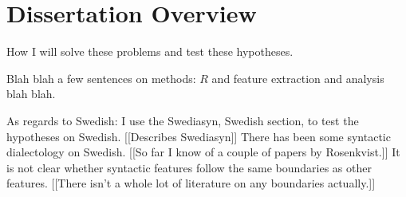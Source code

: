 \section{Dissertation Overview}

How I will solve these problems and test these hypotheses.

Blah blah a few sentences on methods: $R$ and feature extraction and
analysis blah blah.

As regards to Swedish: I use the Swediasyn, Swedish section, to test
the hypotheses on Swedish. [[Describes Swediasyn]]
There has been some syntactic dialectology on
Swedish. [[So far I know of a couple of papers by Rosenkvist.]] It is
not clear whether syntactic features follow the same boundaries as
other features. [[There isn't a whole lot of literature on any
boundaries actually.]]

